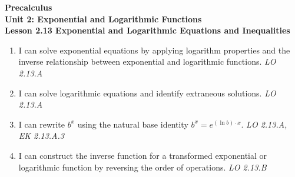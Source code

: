 \documentclass[10pt]{article}
\begin{document}
\vspace{-0.8in}

\begin{center}
  {\color{white}\textbf{\LARGE Precalculus}}\\[4pt]
  {\color{skymid}\large\textbf{Unit 2: Exponential and Logarithmic Functions}}\\[6pt]
  {\color{white}\textbf{\large Lesson 2.13 \quad Exponential and Logarithmic Equations and Inequalities}}
\end{center}

\vspace{0.22in}
\namedateperiod
\vspace{0.18in}

\begin{learningtargetbox}
\small
\begin{enumerate}[leftmargin=1.5em, itemsep=5pt]
  \item I can solve exponential equations by applying logarithm properties and the inverse
        relationship between exponential and logarithmic functions.
        \hfill\textit{LO 2.13.A}
  \item I can solve logarithmic equations and identify extraneous solutions.
        \hfill\textit{LO 2.13.A}
  \item I can rewrite $b^x$ using the natural base identity $b^x = e^{(\ln b)\cdot x}$.
        \hfill\textit{LO 2.13.A, EK 2.13.A.3}
  \item I can construct the inverse function for a transformed exponential or logarithmic
        function by reversing the order of operations.
        \hfill\textit{LO 2.13.B}
\end{enumerate}
\end{learningtargetbox}

\vspace{0.14in}
\end{document}
